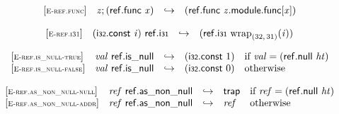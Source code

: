 \vspace{1ex}

$$
\begin{array}{@{}l@{}lcl@{}l@{}}
{[\textsc{\scriptsize E{-}ref.func}]} \quad & {\mathit{z}} ; (\mathsf{ref.func}~{\mathit{x}}) &\hookrightarrow& (\mathsf{ref.func}~{\mathit{z}}.\mathsf{module}.\mathsf{func}[{\mathit{x}}]) &  \\
\end{array}
$$

$$
\begin{array}{@{}l@{}lcl@{}l@{}}
{[\textsc{\scriptsize E{-}ref.i31}]} \quad & (\mathsf{i{\scriptstyle32}}.\mathsf{const}~{\mathit{i}})~\mathsf{ref.i{\scriptstyle31}} &\hookrightarrow& (\mathsf{ref.i{\scriptstyle31}}~{{{\mathrm{wrap}}}_{(32,\, 31)}}{({\mathit{i}})}) &  \\
\end{array}
$$

\vspace{1ex}

$$
\begin{array}{@{}l@{}lcl@{}l@{}}
{[\textsc{\scriptsize E{-}ref.is\_null{-}true}]} \quad & {\mathit{val}}~\mathsf{ref.is\_null} &\hookrightarrow& (\mathsf{i{\scriptstyle32}}.\mathsf{const}~1) &\quad
  \mbox{if}~{\mathit{val}} = (\mathsf{ref.null}~{\mathit{ht}}) \\
{[\textsc{\scriptsize E{-}ref.is\_null{-}false}]} \quad & {\mathit{val}}~\mathsf{ref.is\_null} &\hookrightarrow& (\mathsf{i{\scriptstyle32}}.\mathsf{const}~0) &\quad
  \mbox{otherwise} \\
\end{array}
$$

\vspace{1ex}

$$
\begin{array}{@{}l@{}lcl@{}l@{}}
{[\textsc{\scriptsize E{-}ref.as\_non\_null{-}null}]} \quad & {\mathit{ref}}~\mathsf{ref.as\_non\_null} &\hookrightarrow& \mathsf{trap} &\quad
  \mbox{if}~{\mathit{ref}} = (\mathsf{ref.null}~{\mathit{ht}}) \\
{[\textsc{\scriptsize E{-}ref.as\_non\_null{-}addr}]} \quad & {\mathit{ref}}~\mathsf{ref.as\_non\_null} &\hookrightarrow& {\mathit{ref}} &\quad
  \mbox{otherwise} \\
\end{array}
$$

\vspace{1ex}

